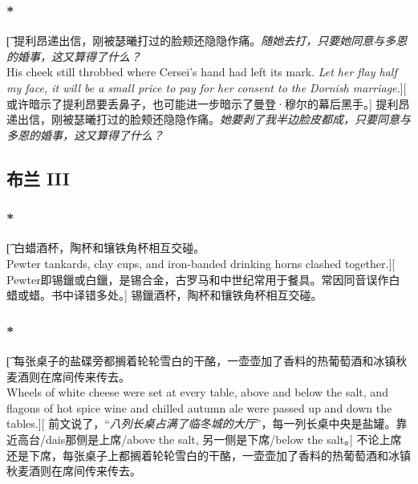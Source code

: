 \documentclass[12pt,a4paper]{article}
\begin{document}
\subsubsection{\color{red}*}\t[	
	提利昂递出信，刚被瑟曦打过的脸颊还隐隐作痛。\emph{随她去打，只要她同意与多恩的婚事，这又算得了什么？}\\
	His cheek still throbbed where Cersei's hand had left its mark. \emph{Let her flay half my face, it will be a small price to pay for her consent to the Dornish marriage.}][
	或许暗示了提利昂要丢鼻子，也可能进一步暗示了曼登·穆尔的幕后黑手。]
	提利昂递出信，刚被瑟曦打过的脸颊还隐隐作痛。\emph{她要剥了我半边脸皮都成，只要同意与多恩的婚事，这又算得了什么？}
	
	

\subsection{布兰 III}	

\subsubsection{\color{red}*}\t[
	白蜡酒杯，陶杯和镶铁角杯相互交碰。\\
	Pewter tankards, clay cups, and iron-banded drinking horns clashed together.][
	Pewter即锡鑞或白鑞，是锡合金，古罗马和中世纪常用于餐具。常因同音误作白蜡或蜡。书中译错多处。]
	锡鑞酒杯，陶杯和镶铁角杯相互交碰。
	
	
\subsubsection{\color{red}*}\t[
	每张桌子的盐碟旁都搁着轮轮雪白的干酪，一壶壶加了香料的热葡萄酒和冰镇秋麦酒则在席间传来传去。\\
	Wheels of white cheese were set at every table, above and below the salt, and flagons of hot spice wine and chilled autumn ale were passed up and down the tables.][
	前文说了，“\emph{八列长桌占满了临冬城的大厅}”，每一列长桌中央是盐罐。靠近高台/dais那侧是上席/above the salt, 另一侧是下席/below the salt。]
	不论上席还是下席，每张桌子上都搁着轮轮雪白的干酪，一壶壶加了香料的热葡萄酒和冰镇秋麦酒则在席间传来传去。
	
\end{document}
